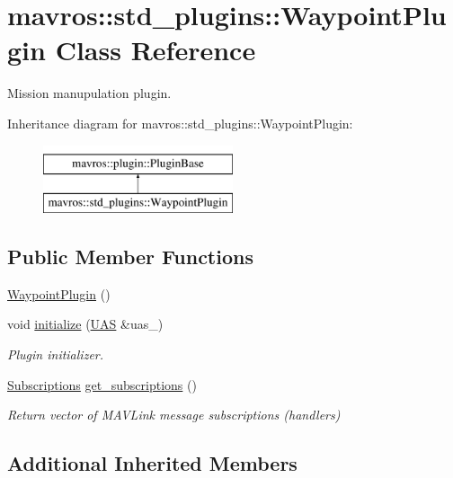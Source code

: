 \hypertarget{classmavros_1_1std__plugins_1_1WaypointPlugin}{}\section{mavros\+::std\+\_\+plugins\+::Waypoint\+Plugin Class Reference}
\label{classmavros_1_1std__plugins_1_1WaypointPlugin}


Mission manupulation plugin.  


Inheritance diagram for mavros\+::std\+\_\+plugins\+::Waypoint\+Plugin\+:\begin{figure}[H]
\begin{center}
\leavevmode
\includegraphics[height=2.000000cm]{classmavros_1_1std__plugins_1_1WaypointPlugin}
\end{center}
\end{figure}
\subsection*{Public Member Functions}
\begin{DoxyCompactItemize}
\item 
\mbox{\hyperlink{group__plugin_ga6aff35d26d32a5d88603dd85119c1056}{Waypoint\+Plugin}} ()
\item 
void \mbox{\hyperlink{group__plugin_gaeacb83ea00ebb3446b99f88a573c9a86}{initialize}} (\mbox{\hyperlink{classmavros_1_1UAS}{U\+AS}} \&uas\+\_\+)
\begin{DoxyCompactList}\small\item\em Plugin initializer. \end{DoxyCompactList}\item 
\mbox{\hyperlink{group__plugin_ga8967d61fc77040e0c3ea5a4585d62a09}{Subscriptions}} \mbox{\hyperlink{group__plugin_ga27f42c57511291aaaf46e268e4833ed2}{get\+\_\+subscriptions}} ()
\begin{DoxyCompactList}\small\item\em Return vector of M\+A\+V\+Link message subscriptions (handlers) \end{DoxyCompactList}\end{DoxyCompactItemize}
\subsection*{Additional Inherited Members}



